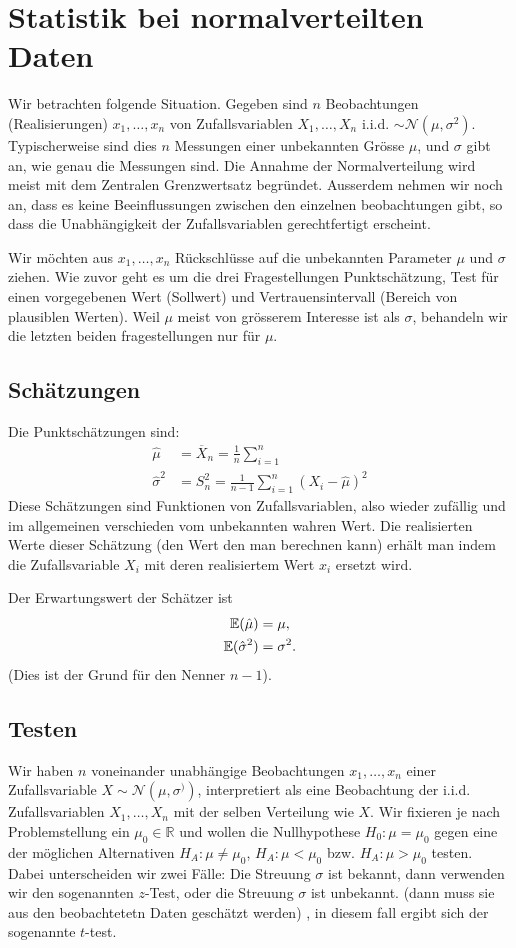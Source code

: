 \chapter{Statistik bei normalverteilten Daten}
Wir betrachten folgende Situation. Gegeben sind $n$ Beobachtungen (Realisierungen) $x_1,\ldots,x_n$ von Zufallsvariablen $X_1,\ldots,X_n$ i.i.d. $\sim \mathcal{N}(\mu,\sigma^2)$. Typischerweise sind dies $n$ Messungen einer unbekannten Grösse $\mu$, und $\sigma$ gibt an, wie genau die Messungen sind. Die Annahme der Normalverteilung wird meist mit dem Zentralen Grenzwertsatz begründet. Ausserdem nehmen wir noch an, dass es keine Beeinflussungen zwischen den einzelnen beobachtungen gibt, so dass die Unabhängigkeit der Zufallsvariablen gerechtfertigt erscheint.

Wir möchten aus $x_1,\ldots,x_n$ Rückschlüsse auf die unbekannten Parameter $\mu$ und $\sigma$ ziehen. Wie zuvor geht es um die drei Fragestellungen Punktschätzung, Test für einen vorgegebenen Wert (Sollwert) und Vertrauensintervall (Bereich von plausiblen Werten). Weil $\mu$ meist von grösserem Interesse ist als $\sigma$, behandeln wir die letzten beiden fragestellungen nur für $\mu$.
\section{Schätzungen}
Die Punktschätzungen sind:
\begin{align}
	\hat{\mu}&=\overline{X}_n=\frac{1}{n}\sum_{i=1}^{n}\\
	\hat{\sigma}^2&=S_{n}^{2}=\frac{1}{n-1}\sum_{i=1}^{n}\left( X_i-\hat{\mu} \right)^2
	\label{eq:schaetzer}
\end{align}
Diese Schätzungen sind Funktionen von Zufallsvariablen, also wieder zufällig und im allgemeinen verschieden vom unbekannten wahren Wert. Die realisierten Werte dieser Schätzung (den Wert den man berechnen kann) erhält man indem die Zufallsvariable $X_i$ mit deren realisiertem Wert $x_i$ ersetzt wird.

Der Erwartungswert der Schätzer ist
\begin{align*}
	\operatorname{\mathbb E}(\hat{\mu})&=\mu,\\
	\operatorname{\mathbb E}(\hat{\sigma}^2)&=\sigma^2.
\end{align*}
(Dies ist der Grund für den Nenner $n-1$).
\section{Testen}
Wir haben $n$ voneinander unabhängige Beobachtungen $x_1,\ldots,x_n$ einer Zufallsvariable $X\sim \mathcal{N}(\mu,\sigma^))$, interpretiert als eine Beobachtung der i.i.d. Zufallsvariablen $X_1,\ldots,X_n$ mit der selben Verteilung wie $X$. Wir fixieren je nach Problemstellung ein $\mu_0\in\mathbb{R}$ und wollen die Nullhypothese $H_0:\mu=\mu_0$ gegen eine der möglichen Alternativen $H_A:\mu\neq \mu_0$, $H_A:\mu<\mu_0$ bzw. $H_A:\mu>\mu_0$ testen. Dabei unterscheiden wir zwei Fälle: Die Streuung $\sigma$ ist bekannt, dann verwenden wir den sogenannten $z$-Test, oder die Streuung $\sigma$ ist unbekannt. (dann muss sie aus den beobachtetetn Daten geschätzt werden) , in diesem fall ergibt sich der sogenannte $t$-test.

